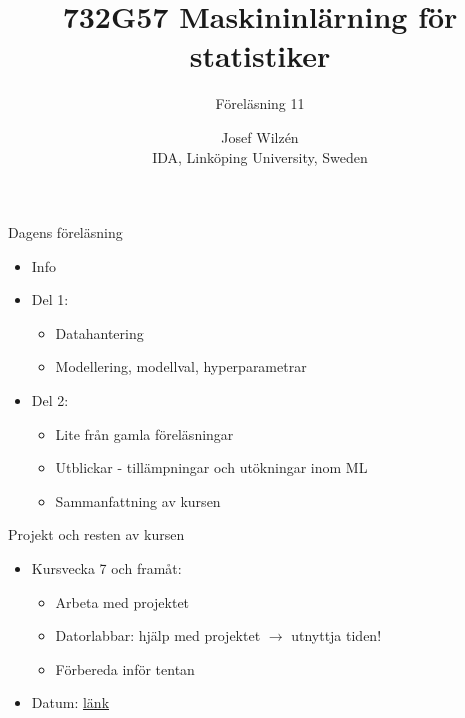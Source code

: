 \documentclass[10pt,english]{beamer}
\title{732G57 Maskininlärning för statistiker}
\subtitle{Föreläsning 11}
\date{}
\author{Josef Wilzén \\ IDA, Linköping University, Sweden}
\begin{document}
\maketitle

\begin{frame}{Dagens föreläsning}

    \begin{itemize}
        \item Info
        \item Del 1:
        \begin{itemize}
          \item Datahantering
          \item Modellering, modellval, hyperparametrar  
        \end{itemize}
        \item Del 2:
        \begin{itemize}
          \item Lite från gamla föreläsningar
          \item Utblickar - tillämpningar och utökningar inom ML
          \item Sammanfattning av kursen
        \end{itemize}
    \end{itemize}
    
\end{frame}

\begin{frame}{Projekt och resten av kursen}
    
  \begin{itemize}
        \item Kursvecka 7 och framåt: 
        \begin{itemize}
          \item Arbeta med projektet
          \item Datorlabbar: hjälp med projektet $\rightarrow$ utnyttja tiden!
          \item Förbereda inför tentan
        \end{itemize}
        \item Datum: \href{https://raw.githubusercontent.com/STIMALiU/732G57_ML/refs/heads/master/project/Datum_ht2024.pdf}{länk}
    \end{itemize}

\end{frame}
\end{document}
